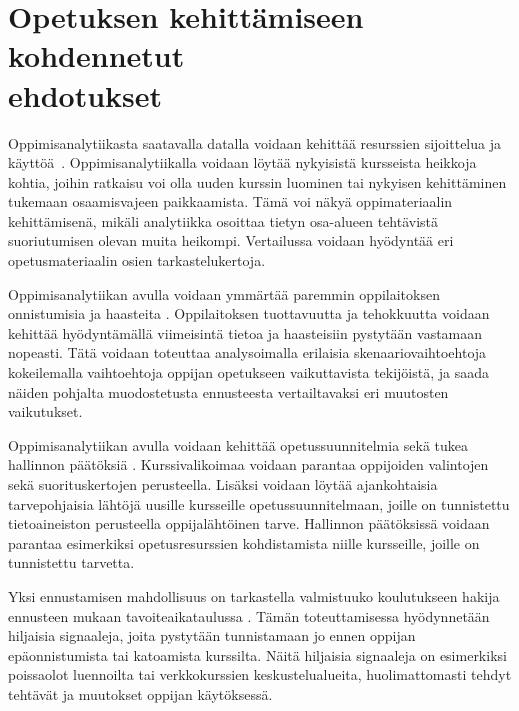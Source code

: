 \section[Opetuksen kehittämiseen kohdennetut ehdotukset]{Opetuksen kehittämiseen kohdennetut \\ ehdotukset}

Oppimisanalytiikasta saatavalla datalla voidaan kehittää resurssien sijoittelua ja käyttöä~\citep{longPenetratingFogAnalytics2011}. Oppimisanalytiikalla voidaan löytää nykyisistä kursseista heikkoja kohtia, joihin ratkaisu voi olla uuden kurssin luominen tai nykyisen kehittäminen tukemaan osaamisvajeen paikkaamista. Tämä voi näkyä oppimateriaalin kehittämisenä, mikäli analytiikka osoittaa tietyn osa-alueen tehtävistä suoriutumisen olevan muita heikompi. Vertailussa voidaan hyödyntää eri opetusmateriaalin osien tarkastelukertoja.

Oppimisanalytiikan avulla voidaan ymmärtää paremmin oppilaitoksen onnistumisia ja haasteita \citep{longPenetratingFogAnalytics2011}. Oppilaitoksen tuottavuutta ja tehokkuutta voidaan kehittää hyödyntämällä viimeisintä tietoa ja haasteisiin pystytään vastamaan nopeasti. Tätä voidaan toteuttaa analysoimalla erilaisia skenaariovaihtoehtoja kokeilemalla vaihtoehtoja oppijan opetukseen vaikuttavista tekijöistä, ja saada näiden pohjalta muodostetusta ennusteesta vertailtavaksi eri muutosten vaikutukset.

Oppimisanalytiikan avulla voidaan kehittää opetussuunnitelmia sekä tukea hallinnon päätöksiä \citep{romeroEducationalDataMining2010,longPenetratingFogAnalytics2011}. Kurssivalikoimaa voidaan parantaa oppijoiden valintojen sekä suorituskertojen perusteella. Lisäksi voidaan löytää ajankohtaisia tarvepohjaisia lähtöjä uusille kursseille opetussuunnitelmaan, joille on tunnistettu tietoaineiston perusteella oppijalähtöinen tarve. Hallinnon päätöksissä voidaan parantaa esimerkiksi opetusresurssien kohdistamista niille kursseille, joille on tunnistettu tarvetta.

Yksi ennustamisen mahdollisuus on tarkastella valmistuuko koulutukseen hakija ennusteen mukaan tavoiteaikataulussa \citep{barberCourseCorrectionUsing2012a}. Tämän toteuttamisessa hyödynnetään hiljaisia signaaleja, joita pystytään tunnistamaan jo ennen oppijan epäonnistumista tai katoamista kurssilta. Näitä hiljaisia signaaleja on esimerkiksi poissaolot luennoilta tai verkkokurssien keskustelualueita, huolimattomasti tehdyt tehtävät ja muutokset oppijan käytöksessä.
